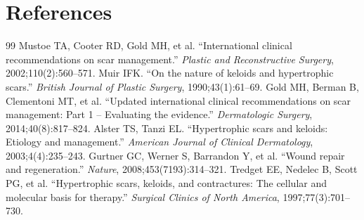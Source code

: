 \section*{References}
\begin{thebibliography}{99}
 Mustoe TA, Cooter RD, Gold MH, et al. ``International clinical recommendations on scar management.'' \textit{Plastic and Reconstructive Surgery}, 2002;110(2):560--571.
 Muir IFK. ``On the nature of keloids and hypertrophic scars.'' \textit{British Journal of Plastic Surgery}, 1990;43(1):61--69.
 Gold MH, Berman B, Clementoni MT, et al. ``Updated international clinical recommendations on scar management: Part 1 -- Evaluating the evidence.'' \textit{Dermatologic Surgery}, 2014;40(8):817--824.
 Alster TS, Tanzi EL. ``Hypertrophic scars and keloids: Etiology and management.'' \textit{American Journal of Clinical Dermatology}, 2003;4(4):235--243.
 Gurtner GC, Werner S, Barrandon Y, et al. ``Wound repair and regeneration.'' \textit{Nature}, 2008;453(7193):314--321.
 Tredget EE, Nedelec B, Scott PG, et al. ``Hypertrophic scars, keloids, and contractures: The cellular and molecular basis for therapy.'' \textit{Surgical Clinics of North America}, 1997;77(3):701--730.
\end{thebibliography}
